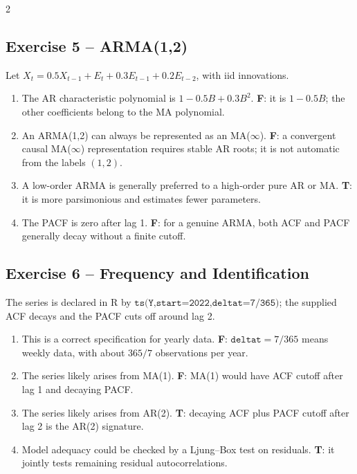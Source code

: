 \documentclass[9pt,a4paper]{extarticle}
\begin{document}
\begin{multicols}{2}
\subsection*{Exercise 5 -- ARMA(1,2)}
Let \(X_t=0.5X_{t-1}+E_t+0.3E_{t-1}+0.2E_{t-2}\), with iid innovations.
\begin{enumerate}[label=\alph*),leftmargin=4mm]
\item The AR characteristic polynomial is \(1-0.5B+0.3B^2\). \textbf{F}: it is \(1-0.5B\); the other coefficients belong to the MA polynomial.
\item An ARMA(1,2) can always be represented as an MA(\(\infty\)). \textbf{F}: a convergent causal MA(\(\infty\)) representation requires stable AR roots; it is not automatic from the labels \((1,2)\).
\item A low-order ARMA is generally preferred to a high-order pure AR or MA. \textbf{T}: it is more parsimonious and estimates fewer parameters.
\item The PACF is zero after lag 1. \textbf{F}: for a genuine ARMA, both ACF and PACF generally decay without a finite cutoff.
\end{enumerate}

\subsection*{Exercise 6 -- Frequency and Identification}
The series is declared in R by \(\texttt{ts(Y,start=2022,deltat=7/365)}\); the supplied ACF decays and the PACF cuts off around lag 2.
\begin{enumerate}[label=\alph*),leftmargin=4mm]
\item This is a correct specification for yearly data. \textbf{F}: \(\texttt{deltat}=7/365\) means weekly data, with about \(365/7\) observations per year.
\item The series likely arises from MA(1). \textbf{F}: MA(1) would have ACF cutoff after lag 1 and decaying PACF.
\item The series likely arises from AR(2). \textbf{T}: decaying ACF plus PACF cutoff after lag 2 is the AR(2) signature.
\item Model adequacy could be checked by a Ljung--Box test on residuals. \textbf{T}: it jointly tests remaining residual autocorrelations.
\end{enumerate}


\end{multicols}
\end{document}
